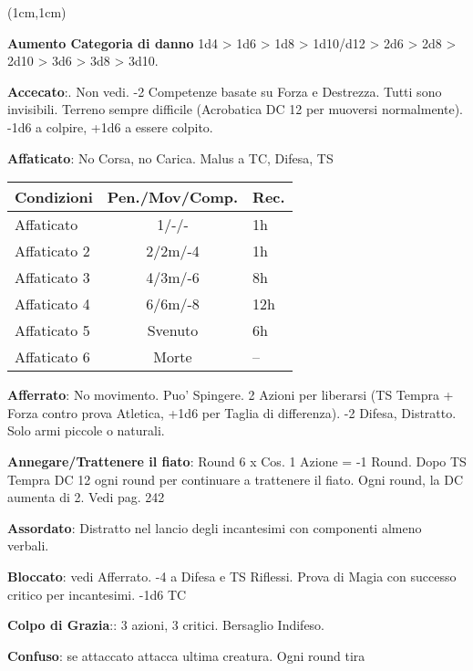 \documentclass[a4paper,12 pt,openany]{book}
\begin{document}
\center

\footnotesize

\begin{textblock*}{19 cm}(1cm,1cm) %
\flushleft

\begin{multicols}{2}
	
\textbf{Aumento Categoria di danno} 1d4 > 1d6 > 1d8 > 1d10/d12 > 2d6 > 2d8 > 2d10 > 3d6 > 3d8 > 3d10.

\textbf{Accecato}:. Non vedi. -2  Competenze basate su Forza e Destrezza. Tutti sono invisibili. Terreno sempre difficile (Acrobatica DC 12 per muoversi normalmente). -1d6 a colpire, +1d6 a essere colpito.

\textbf{Affaticato}: No Corsa, no Carica. Malus a TC, Difesa, TS

\begin{tabularx}{0.45\textwidth}{lcl}
	\textbf{Condizioni}& \textbf{Pen./Mov/Comp.}&\textbf{Rec.}\\
	\hline
Affaticato  &1/-/-&1h\\
Affaticato 2&2/2m/-4&1h\\
Affaticato 3&4/3m/-6&8h\\
Affaticato 4&6/6m/-8&12h\\
Affaticato 5&Svenuto&6h\\
Affaticato 6&Morte&--
\end{tabularx}

\textbf{Afferrato}: No movimento. Puo' Spingere. 2 Azioni per liberarsi (TS Tempra + Forza contro prova Atletica, +1d6 per Taglia di differenza). -2 Difesa, Distratto. Solo armi piccole o naturali.

\textbf{Annegare/Trattenere il fiato}: Round 6 x Cos. 1 Azione = -1 Round. Dopo TS Tempra DC 12 ogni round per continuare a trattenere il fiato. Ogni round, la DC aumenta di 2. Vedi pag. 242

\textbf{Assordato}: Distratto nel lancio degli incantesimi con componenti almeno verbali.

\textbf{Bloccato}: vedi Afferrato. -4 a Difesa e TS Riflessi. Prova di Magia con successo critico per incantesimi. -1d6 TC

\textbf{Colpo di Grazia}:: 3 azioni, 3 critici. Bersaglio Indifeso.

\textbf{Confuso}: se attaccato attacca ultima creatura.
Ogni round tira


\end{multicols}
\end{textblock*}
\end{document}
